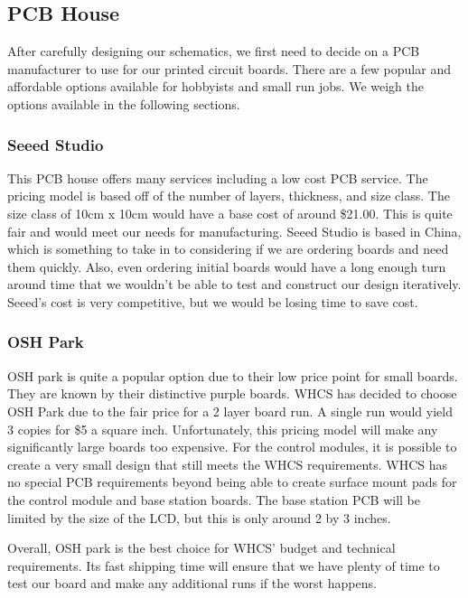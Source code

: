 \subsection{PCB House}
After carefully designing our schematics, we first need to decide on a PCB
manufacturer to use for our printed circuit boards. There are a few popular and
affordable options available for hobbyists and small run jobs. We weigh the
options available in the following sections.

\subsubsection{Seeed Studio}
This PCB house offers many services including a low cost PCB service. The
pricing model is based off of the number of layers, thickness, and size class.
The size class of 10cm x 10cm would have a base cost of around \$21.00. This is
quite fair and would meet our needs for manufacturing.  Seeed Studio is based
in China, which is something to take in to considering if we are ordering
boards and need them quickly. Also, even ordering initial boards would have a
long enough turn around time that we wouldn't be able to test and construct our
design iteratively. Seeed's cost is very competitive, but we would be losing
time to save cost.


\subsubsection{OSH Park}
OSH park is quite a popular option due to their low price point for small
boards. They are known by their distinctive purple boards. WHCS has decided to
choose OSH Park due to the fair price for a 2 layer board run. A single
run would yield 3 copies for \$5 a square inch. Unfortunately, this pricing
model will make any significantly large boards too expensive. For the control
modules, it is possible to create a very small design that still meets the WHCS
requirements.  WHCS has no special PCB requirements beyond being able to create
surface mount pads for the control module and base station boards.  The base
station PCB will be limited by the size of the LCD, but this is only around 2
by 3 inches.

Overall, OSH park is the best choice for WHCS' budget and technical
requirements. Its fast shipping time will ensure that we have plenty of time to test our board and make any additional runs if the worst happens.

